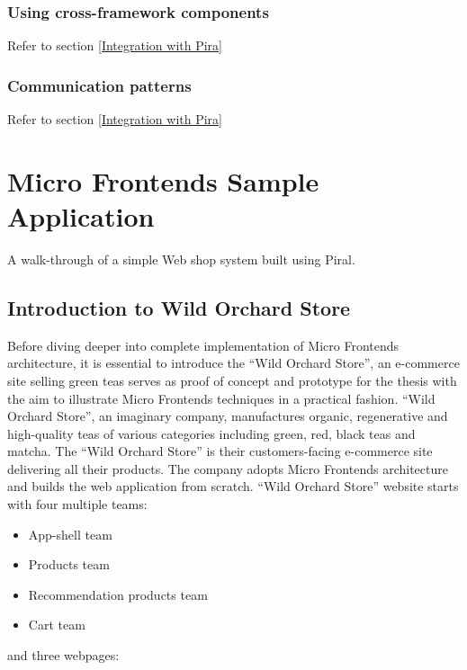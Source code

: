 \documentclass[a4paper]{book}
\begin{document}
\subsection{Using cross-framework components}

Refer to section \ref{Integration with Pira}

\subsection{Communication patterns}

Refer to section \ref{Integration with Pira}



\chapter{Micro Frontends Sample Application} \label{Micro Frontends Sample Application}
A walk-through of a simple Web shop system built using Piral. 
\section{Introduction to Wild Orchard Store}

Before diving deeper into complete implementation of Micro Frontends architecture, it is essential to introduce the “Wild Orchard Store”, an e-commerce site selling green teas serves as proof of concept and prototype for the thesis with the aim to illustrate Micro Frontends techniques in a practical fashion. “Wild Orchard Store”, an imaginary company, manufactures organic, regenerative and high-quality teas of various categories including green, red, black teas and matcha. The “Wild Orchard Store” is their customers-facing e-commerce site delivering all their products. 
The company adopts Micro Frontends architecture and builds the web application from scratch. “Wild Orchard Store” website starts with four multiple teams:

\begin{itemize}
    \item App-shell team
    \item Products team
    \item Recommendation products team
    \item Cart team
\end{itemize}
and three webpages:
\end{document}
